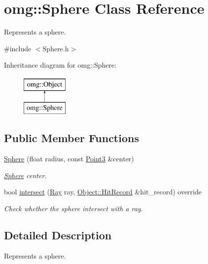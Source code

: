 \hypertarget{classomg_1_1_sphere}{}\section{omg\+::Sphere Class Reference}
\label{classomg_1_1_sphere}


Represents a sphere.  




{\ttfamily \#include $<$Sphere.\+h$>$}

Inheritance diagram for omg\+::Sphere\+:\begin{figure}[H]
\begin{center}
\leavevmode
\includegraphics[height=2.000000cm]{classomg_1_1_sphere}
\end{center}
\end{figure}
\subsection*{Public Member Functions}
\begin{DoxyCompactItemize}
\item 
\mbox{\hyperlink{classomg_1_1_sphere_a81f9a5180b9c883ce00669d4af4d38db}{Sphere}} (float radius, const \mbox{\hyperlink{namespaceomg_af3df7d66f0c70fe64649fcbe00edba5e}{Point3}} \&center)
\begin{DoxyCompactList}\small\item\em \mbox{\hyperlink{classomg_1_1_sphere}{Sphere}} center. \end{DoxyCompactList}\item 
\mbox{\label{classomg_1_1_sphere_af1c6cd10afe11eeb3c9d6c42722ab039}} 
bool \mbox{\hyperlink{classomg_1_1_sphere_af1c6cd10afe11eeb3c9d6c42722ab039}{intersect}} (\mbox{\hyperlink{classomg_1_1_ray}{Ray}} ray, \mbox{\hyperlink{structomg_1_1_object_1_1_hit_record}{Object\+::\+Hit\+Record}} \&hit\+\_\+record) override
\begin{DoxyCompactList}\small\item\em Check whether the sphere intersect with a ray. \end{DoxyCompactList}\end{DoxyCompactItemize}


\subsection{Detailed Description}
Represents a sphere. 

